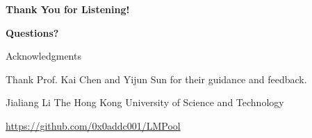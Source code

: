 \documentclass[aspectratio=169,10pt]{beamer}
\begin{document}
\begin{frame}[plain]
  \begin{center}
    \vspace{1.0em}
    {\color{LMBlue}\Huge\bfseries Thank You for Listening!}

    \vspace{1.4em}
    {\Large\color{LMBlue}\bfseries Questions?}

    \vspace{3em}
    {\Large Acknowledgments}

    \vspace{1em}
    \begin{minipage}{0.72\textwidth}
      \centering
      Thank Prof. Kai Chen and Yijun Sun for their guidance and feedback.
    \end{minipage}

    \vfill
    \small
    Jialiang Li \quad The Hong Kong University of Science and Technology

    \vspace{0.35em}
    \url{https://github.com/0x0addc001/LMPool}
  \end{center}
\end{frame}
\end{document}
